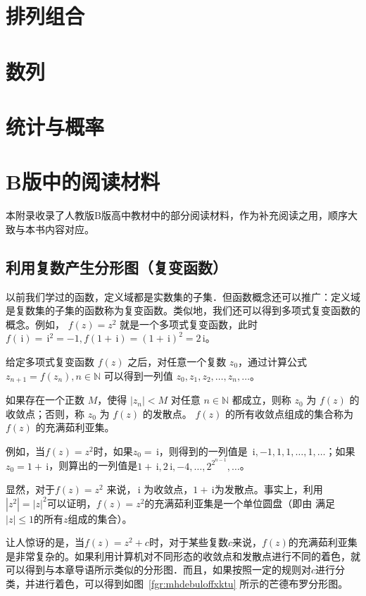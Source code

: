 \documentclass[a4paper,openany]{ctexbook}
\newcommand{\ii}{\,\mathrm{i}}
\begin{document}
\chapter{排列组合}

\chapter{数列}

\chapter{统计与概率}

\appendix

\chapter{B版中的阅读材料}

本附录收录了人教版B版高中教材中的部分阅读材料，作为补充阅读之用，顺序大致与本书内容对应。

\section{利用复数产生分形图（复变函数）}

以前我们学过的函数，定义域都是实数集的子集．但函数概念还可以推广：定义域是复数集的子集的函数称为复变函数。类似地，我们还可以得到多项式复变函数的概念。例如，%
\(f(z)=z^2\) 就是一个多项式复变函数，此时 \(f(\ii)=\ii^2=-1,f(1+\ii)=(1+\ii)^2=2\ii\)。

给定多项式复变函数 \(f(z)\) 之后，对任意一个复数 \(z_0\)，通过计算公式 \(z_{n+1}=f(z_n),n\in \mathbb{N}\) 可以得到一列值 \(z_0,z_1,z_2,\dots,z_n,\dots\)。

如果存在一个正数 \(M\)，使得 \(|z_n|<M\) 对任意 \(n\in \mathbb{N}\) 都成立，则称 \(z_0\) 为 \(f(z)\) 的收敛点；否则，称 \(z_0\) 为 \(f(z)\) 的发散点。%
\(f(z)\) 的所有收敛点组成的集合称为 \(f(z)\) 的充满茹利亚集。

例如，当\(f(z)=z^2\)时，如果\(z_0=\ii\)，则得到的一列值是 \(\ii,-1,1,1,\dots,1,\dots\)；如果 \(z_0=1+\ii\)，则算出的一列值是\(1+\ii,2\ii,-4,\dots,2^{2^{n-1}},\dots\)。

显然，对于\(f(z)=z^2\) 来说，\(\ii\) 为收敛点，\(1+\ii\)为发散点。事实上，利用\(|z^2|=|z|^2\)可以证明，\(f(z)=z^2\)的充满茹利亚集是一个单位圆盘（即由
满足\(|z|\le 1\)的所有\(z\)组成的集合）。

让人惊讶的是，当\(f(z)=z^2+c\)时，对于某些复数\(c\)来说，\(f(z)\)的充满茹利亚集是非常复杂的。如果利用计算机对不同形态的收敛点和发散点进行不同的着色，就
可以得到与本章导语所示类似的分形图．而且，如果按照一定的规则对\(c\)进行分类，并进行着色，可以得到如图~\ref{fgr:mhdebuloffxktu} 所示的芒德布罗分形图。
\end{document}
